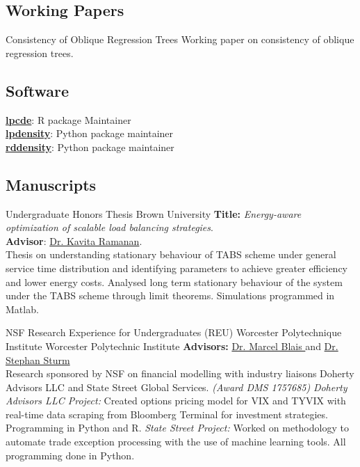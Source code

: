 \documentclass[10pt,a4paper,roman]{moderncv}        %
\begin{document}
\subsection{Working Papers}
{Consistency of Oblique Regression Trees}{}{}
{Working paper on consistency of oblique regression trees.}

\subsection{Software}
\color{blue}\href{https://nppackages.github.io/lpcde/}{\textbf{lpcde}}\color{black}:
R package Maintainer
\\
\color{blue}\href{https://nppackages.github.io/lpdensity_doc/}
{\textbf{lpdensity}}\color{black}: Python package maintainer
\\
\color{blue}\href{https://rdpackages.github.io/rddensity_doc/}
{\textbf{rddensity}}\color{black}: Python package maintainer

\subsection{Manuscripts}
{Undergraduate Honors Thesis}
{Brown University}{}
{\textbf{Title:} \textit{Energy-aware optimization of scalable load balancing strategies}.\\
  \textbf{Advisor}: \color{blue}\href{https://www.brown.edu/academics/applied-mathematics/faculty/kavita-ramanan/home}
{Dr. Kavita Ramanan}\color{black}.\\
Thesis on understanding stationary behaviour of TABS scheme
under general service time distribution and identifying parameters
to achieve greater efficiency and lower energy costs.
Analysed long term stationary behaviour of the system under the TABS scheme
through limit theorems.
Simulations programmed in Matlab.}

{NSF Research Experience for Undergraduates (REU) }
{Worcester Polytechnique Institute}
{Worcester Polytechnic Institute}
{\textbf{Advisors:}
  \color{blue}\href{https://www.wpi.edu/people/faculty/myblais}{Dr. Marcel Blais
  }\color{black}
  and \color{blue}\href{https://www.wpi.edu/people/faculty/ssturm}{Dr. Stephan Sturm
  }\color{black}
  \\
  Research sponsored by NSF on financial modelling
  with industry liaisons Doherty Advisors LLC and State Street Global Services.
  \textit{(Award DMS 1757685)}
  \newline{}%
\textit{Doherty Advisors LLC Project:}
Created options pricing model for VIX and TYVIX with real-time data scraping
from Bloomberg Terminal for investment strategies.
Programming in Python and R.
\newline{}
\textit{State Street Project:}
Worked on methodology to automate trade exception processing with the use of
machine learning tools. All programming done in Python.
}
\end{document}
